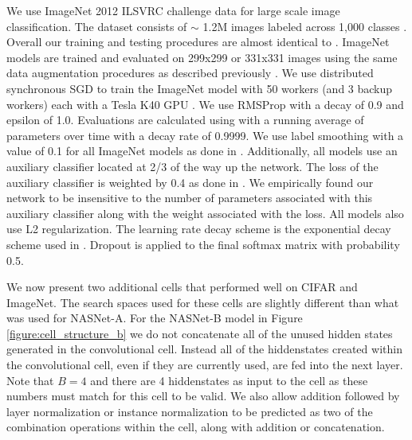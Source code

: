 \documentclass[10pt,twocolumn,letterpaper]{article}
\begin{document}
We use ImageNet 2012 ILSVRC challenge data for large scale image classification. The dataset consists of $\sim$ 1.2M images labeled across 1,000 classes \cite{deng2009imagenet}. Overall our training and testing procedures are almost identical to \cite{szegedy2016rethinking}. ImageNet models are trained and evaluated on 299x299 or 331x331 images using the same data augmentation procedures as described previously \cite{szegedy2016rethinking}. We use distributed synchronous SGD to train the ImageNet model with 50 workers (and 3 backup workers) each with a Tesla K40 GPU \cite{synchsgd}. We use RMSProp with a decay of 0.9 and epsilon of 1.0. Evaluations are calculated using with a running average of parameters over time with a decay rate of 0.9999. We use label smoothing with a value of 0.1 for all ImageNet models as done in \cite{szegedy2016rethinking}. Additionally, all models use an auxiliary classifier located at 2/3 of the way up the network. The loss of the auxiliary classifier is weighted by 0.4 as done in \cite{szegedy2016rethinking}. We empirically found our network to be insensitive to the number of parameters associated with this auxiliary classifier along with the weight associated with the loss. All models also use L2 regularization.  The learning rate decay scheme is the exponential decay scheme used in \cite{szegedy2016rethinking}.  Dropout is applied to the final softmax matrix with probability 0.5.

We now present two additional cells that performed well on CIFAR and ImageNet. The search spaces used for these cells are slightly different than what was used for NASNet-A. For the NASNet-B model in Figure \ref{figure:cell_structure_b} we do not concatenate all of the unused hidden states generated in the convolutional cell. Instead all of the hiddenstates created within the convolutional cell, even if they are currently used, are fed into the next layer. Note that $B=4$ and there are 4 hiddenstates as input to the cell as these numbers must match for this cell to be valid. We also allow addition followed by layer normalization \cite{ba2016layer} or instance normalization \cite{ulyanov2016instance} to be predicted as two of the combination operations within the cell, along with addition or concatenation. 
\end{document}
